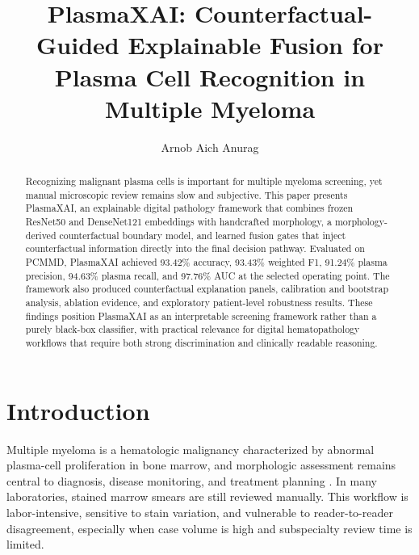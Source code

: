 \documentclass[runningheads]{llncs}
\begin{document}
\title{PlasmaXAI: Counterfactual-Guided Explainable Fusion for Plasma Cell Recognition in Multiple Myeloma}
\author{Arnob Aich Anurag}

\maketitle
\thispagestyle{plain}

\begin{abstract}
Recognizing malignant plasma cells is important for multiple myeloma screening, yet manual microscopic review remains slow and subjective. This paper presents PlasmaXAI, an explainable digital pathology framework that combines frozen ResNet50 and DenseNet121 embeddings with handcrafted morphology, a morphology-derived counterfactual boundary model, and learned fusion gates that inject counterfactual information directly into the final decision pathway. Evaluated on PCMMD, PlasmaXAI achieved 93.42\% accuracy, 93.43\% weighted F1, 91.24\% plasma precision, 94.63\% plasma recall, and 97.76\% AUC at the selected operating point. The framework also produced counterfactual explanation panels, calibration and bootstrap analysis, ablation evidence, and exploratory patient-level robustness results. These findings position PlasmaXAI as an interpretable screening framework rather than a purely black-box classifier, with practical relevance for digital hematopathology workflows that require both strong discrimination and clinically readable reasoning.
\end{abstract}

\section{Introduction}
Multiple myeloma is a hematologic malignancy characterized by abnormal plasma-cell proliferation in bone marrow, and morphologic assessment remains central to diagnosis, disease monitoring, and treatment planning \cite{mmreview}. In many laboratories, stained marrow smears are still reviewed manually. This workflow is labor-intensive, sensitive to stain variation, and vulnerable to reader-to-reader disagreement, especially when case volume is high and subspecialty review time is limited.
\end{document}
